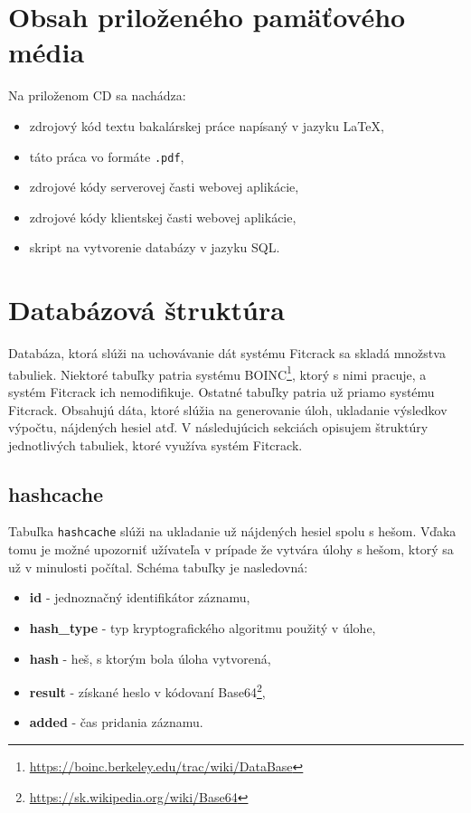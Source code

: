 \documentclass[zadani,slovak]{fitthesis}
\begin{document}
  \ifODSAZ
    \setlength{\parskip}{0.5\bigskipamount}
  \else
    \setlength{\parskip}{0pt}
  \fi
  
  \iftwoside
    \cleardoublepage
  \fi
  

\chapter{Obsah priloženého pamäťového média}
Na priloženom CD sa nachádza:
\begin{itemize}
    \item zdrojový kód textu bakalárskej práce napísaný v jazyku \LaTeX,
    \item táto práca vo formáte \texttt{.pdf},
    \item zdrojové kódy serverovej časti webovej aplikácie,
    \item zdrojové kódy klientskej časti webovej aplikácie,
    \item skript na vytvorenie databázy v jazyku SQL.
\end{itemize}



\chapter{Databázová štruktúra}
\label{DBstructure}

Databáza, ktorá slúži na uchovávanie dát systému Fitcrack sa skladá množstva tabuliek. Niektoré tabuľky patria systému BOINC\footnote{\url{https://boinc.berkeley.edu/trac/wiki/DataBase}}, ktorý s nimi pracuje, a systém Fitcrack ich nemodifikuje. Ostatné tabuľky patria už priamo systému Fitcrack. Obsahujú dáta, ktoré slúžia na generovanie úloh, ukladanie výsledkov výpočtu, nájdených hesiel atď. V následujúcich sekciách opisujem štruktúry jednotlivých tabuliek, ktoré využíva systém Fitcrack.

\section{hashcache} \label{fcHashcache}
Tabuľka \texttt{hashcache} slúži na ukladanie už nájdených hesiel spolu s hešom. Vďaka tomu je možné upozorniť užívateľa v prípade že vytvára úlohy s hešom, ktorý sa už v minulosti počítal. Schéma tabuľky je nasledovná:
\begin{itemize}
    \item \textbf{id} - jednoznačný identifikátor záznamu,
    \item \textbf{hash\_type} - typ kryptografického algoritmu použitý v úlohe,
    \item \textbf{hash} - heš, s ktorým bola úloha vytvorená,
    \item \textbf{result} - získané heslo v kódovaní Base64\footnote{\url{https://sk.wikipedia.org/wiki/Base64}},
    \item \textbf{added} - čas pridania záznamu.
\end{itemize}
\end{document}
